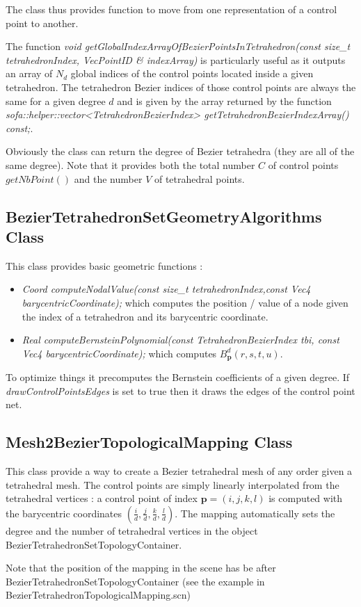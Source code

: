 \documentclass[a4paper,11pt]{article}
\newcommand{\ncontrols}{{C}}
\newcommand{\degree}{{d}}
\begin{document}
The class thus provides function to move from one representation of a control point to another.

The function {\it void getGlobalIndexArrayOfBezierPointsInTetrahedron(const size\_t tetrahedronIndex, VecPointID \& indexArray) } is particularly useful as it outputs an array of $N_\degree$ global indices of the control points located inside a given tetrahedron. The tetrahedron Bezier indices of those control points are always the same for a given degree $\degree$ and is given by the array returned by the function {\it sofa::helper::vector<TetrahedronBezierIndex> getTetrahedronBezierIndexArray() const;}.

Obviously the class can return the degree of  Bezier tetrahedra (they are all of the same degree). Note that it provides both the total number $\ncontrols$ of control points $getNbPoint()$ and the number $V$ of tetrahedral points.



\subsection{BezierTetrahedronSetGeometryAlgorithms Class}

This class provides basic geometric functions :

\begin{itemize}
	\item {\it Coord computeNodalValue(const size\_t tetrahedronIndex,const Vec4 barycentricCoordinate); } which computes the position / value of a node given the index of a tetrahedron and its barycentric coordinate.
	\item {\it Real computeBernsteinPolynomial(const TetrahedronBezierIndex tbi, const Vec4 barycentricCoordinate);} which computes $B^d_{\mathbf p}(r,s,t,u)$.
\end{itemize}

To optimize things it precomputes the Bernstein coefficients of a given degree. If {\it drawControlPointsEdges} is set to true then it draws the edges of the control point net.  

\subsection{Mesh2BezierTopologicalMapping Class}

This class provide a way to create a Bezier tetrahedral mesh of any order given a tetrahedral mesh. The control points are simply linearly interpolated from the tetrahedral vertices : a control point of index ${\mathbf p}=(i,j,k,l)$ is computed with the barycentric coordinates $(\frac{i}{\degree},\frac{j}{\degree},\frac{k}{\degree},\frac{l}{\degree})$. The mapping automatically sets the degree and the number of tetrahedral vertices in the object BezierTetrahedronSetTopologyContainer.

Note that the position of the mapping in the scene has be after BezierTetrahedronSetTopologyContainer (see the example in BezierTetrahedronTopologicalMapping.scn) 
\end{document}
